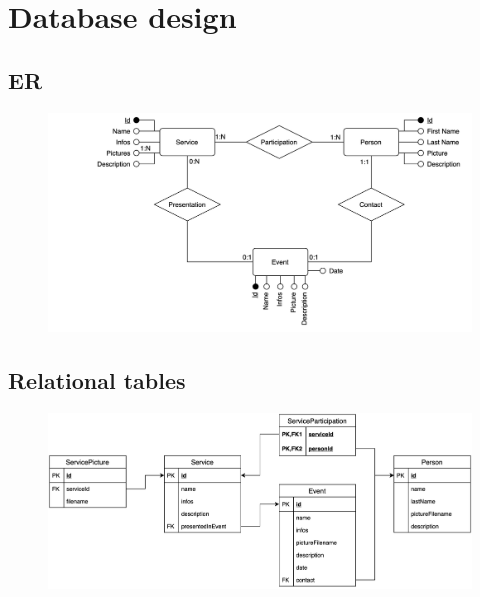 \documentclass[a4paper, 11pt, parskip=half, headsepline]{scrreprt}
\begin{document}
\chapter{Database design}

\section{ER}

\begin{figure}[H]
    \centering
    \includegraphics[width=0.85\linewidth, keepaspectratio]{DB/ER}
\end{figure}

\section{Relational tables}

\begin{figure}[H]
    \centering
    \includegraphics[width=0.85\linewidth, keepaspectratio]{DB/RelationalTables}
\end{figure}
\end{document}
